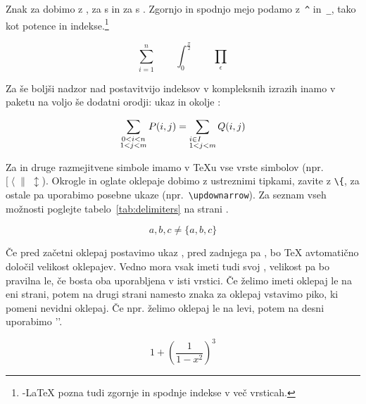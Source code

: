 Znak za \textbf{} dobimo z , za 
\textbf{} s  in za \textbf{}
s . Zgornjo in spodnjo mejo podamo z~\verb|^| in~\verb|_|, tako 
kot potence in indekse.\footnote{\AmS-\LaTeX{} pozna tudi zgornje in spodnje indekse v več vrsticah.}
\begin{example}
\begin{displaymath}
\sum_{i=1}^{n} \qquad
\int_{0}^{\frac{\pi}{2}} \qquad
\prod_\epsilon
\end{displaymath}
\end{example}

Za še boljši nadzor nad postavitvijo indeksov v kompleksnih 
izrazih inamo v paketu  na voljo še dodatni orodji:
ukaz  in okolje :
\begin{example}
\begin{displaymath}
\sum_{\substack{0<i<n \\ 1<j<m}}
   P(i,j) =
\sum_{\begin{subarray}{l}
         i\in I\\
         1<j<m
      \end{subarray}}     Q(i,j)
\end{displaymath}
\end{example}

\medskip

Za \textbf{} in druge razmejitvene simbole imamo v 
\TeX{}u vse vrste simbolov (npr.~$[\;\langle\;\|\;\updownarrow$).
Okrogle in oglate oklepaje dobimo z ustreznimi tipkami, zavite z \verb|\{|, 
za ostale pa uporabimo posebne ukaze (npr.~\verb|\updownarrow|). Za seznam vseh 
možnosti poglejte tabelo~\ref{tab:delimiters} na strani \pageref{tab:delimiters}.
\begin{example}
\begin{displaymath}
{a,b,c}\neq\{a,b,c\}
\end{displaymath}
\end{example}

Če pred začetni oklepaj postavimo ukaz , pred zadnjega pa , bo \TeX{} avtomatično 
določil velikost oklepajev. Vedno mora vsak  imeti tudi svoj , velikost pa bo pravilna le,
če bosta oba uporabljena v isti vrstici. Če želimo imeti oklepaj le na eni strani, potem na drugi 
strani namesto znaka za oklepaj vstavimo piko, ki pomeni nevidni oklepaj. Če npr. želimo oklepaj le na 
levi, potem na desni uporabimo ''.
\begin{example}
\begin{displaymath}
1 + \left( \frac{1}{ 1-x^{2} }
    \right) ^3
\end{displaymath}
\end{example}

